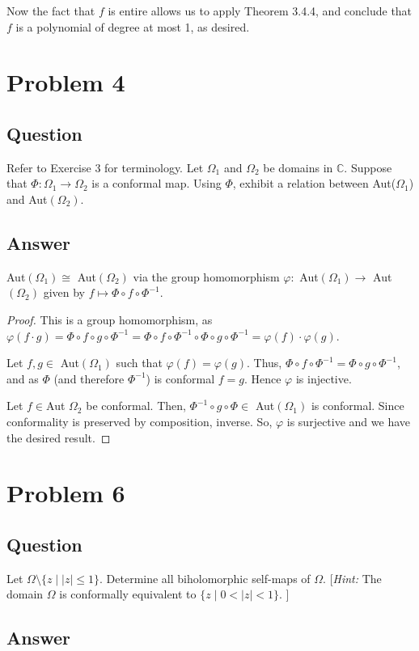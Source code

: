 \documentclass[11pt]{article}
\begin{document}
Now the fact that $f$ is entire allows us to apply Theorem 3.4.4, and conclude that $f$ is a polynomial of degree at most 1, as desired.

\section{Problem 4}
\subsection{Question}
Refer to Exercise 3 for terminology. Let $\Omega_1$ and $\Omega_2$ be domains in $\mathbb{C}$. Suppose that $\Phi: \Omega_1 \to \Omega_2$ is a conformal map. Using $\Phi$, exhibit a relation between Aut($\Omega_1$) and Aut$(\Omega_2)$.
\subsection{Answer}
Aut$(\Omega_1) \cong$ Aut$(\Omega_2)$ via the group homomorphism $\varphi: $ Aut$(\Omega_1) \to $ Aut$(\Omega_2)$ given by  $f \mapsto  \Phi \circ f \circ \Phi^{-1}$.

\begin{proof}
This is a group homomorphism, as $\varphi(f \cdot g) = \Phi \circ f \circ g \circ \Phi^{-1} =  \Phi \circ f \circ \Phi^{-1} \circ \Phi \circ g \circ \Phi^{-1} = \varphi(f) \cdot \varphi(g)$.

Let $f, g \in$ Aut$(\Omega_1)$ such that $\varphi(f) = \varphi(g)$. Thus, $\Phi \circ f \circ \Phi^{-1} = \Phi \circ g \circ \Phi^{-1}$, and as $\Phi$ (and therefore $\Phi^{-1}$) is conformal $f=g$. Hence $\varphi$ is injective.

Let $f \in $Aut $\Omega_2$ be conformal. Then, $\Phi^{-1} \circ g \circ \Phi \in $ Aut$(\Omega_1)$ is conformal. Since conformality is preserved by composition, inverse. So, $\varphi$ is surjective and we have the desired result.
\end{proof}

\section{Problem 6}
\subsection{Question}
Let $\Omega \setminus \{ z \mid |z| \leq 1\}$. Determine all biholomorphic self-maps of $\Omega$. [\emph{Hint: } The domain $\Omega$ is conformally equivalent to $\{z \mid 0 < |z| <1\}$. ]
\subsection{Answer}
\end{document}
